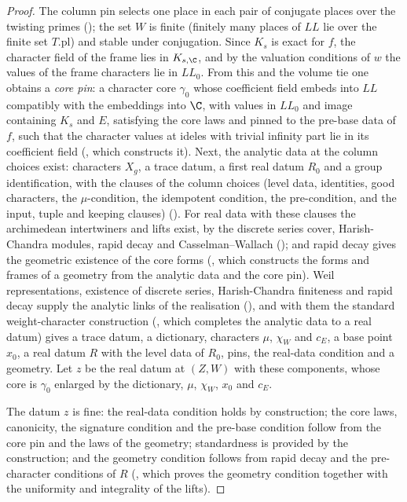 \begin{proof}
The column pin selects one place in each pair of conjugate places over the twisting primes
(); the set $W$ is finite (finitely many places of $\mathit{LL}$ lie over the finite set
$T.\mathrm{pl}$) and stable under conjugation. Since $K_s$ is exact for $f$, the character field of the frame lies in $K_{s,\C}$, and by the
valuation conditions of $w$ the values of the frame characters lie in $\mathit{LL}_0$. From this and the volume tie one obtains a \emph{core pin}: a character core $\gamma_0$ whose
coefficient field embeds into $\mathit{LL}$ compatibly with the embeddings into $\C$, with values in $\mathit{LL}_0$ and image containing
$K_s$ and $E$, satisfying the core laws and pinned to the pre-base data of $f$, such that the character values at ideles with trivial
infinity part lie in its coefficient field (, which constructs it).
Next, the analytic data at the column choices exist: characters $X_g$, a trace datum, a first real datum $R_0$ and a group identification,
with the clauses of the column choices (level data, identities, good characters, the $\mu$-condition, the idempotent condition, the
pre-condition, and the input, tuple and keeping clauses) (). For
real data with these clauses the archimedean intertwiners and lifts exist, by the discrete series cover, Harish-Chandra modules, rapid decay and
Casselman--Wallach (); and rapid decay gives the geometric existence of the
core forms (, which constructs the forms and frames of a geometry
from the analytic data and the core pin). Weil representations, existence of discrete series, Harish-Chandra finiteness and rapid decay
supply the analytic links of the realisation (), and with them
the standard weight-character construction (, which completes the analytic
data to a real datum) gives a trace datum, a dictionary, characters $\mu$, $\chi_W$ and $c_E$, a base point $x_0$, a real datum $R$ with the
level data of $R_0$, pins, the real-data condition and a geometry. Let $z$ be the real datum at $(Z,W)$ with these components, whose core is
$\gamma_0$ enlarged by the dictionary, $\mu$, $\chi_W$, $x_0$ and $c_E$.

The datum $z$ is fine: the real-data condition holds by construction; the core laws, canonicity, the signature condition and the pre-base
condition follow from the core pin and the laws of the geometry; standardness is provided by the construction; and the geometry condition
follows from rapid decay and the pre-character conditions of $R$ (, which
proves the geometry condition together with the uniformity and integrality of the lifts).
\end{proof}


